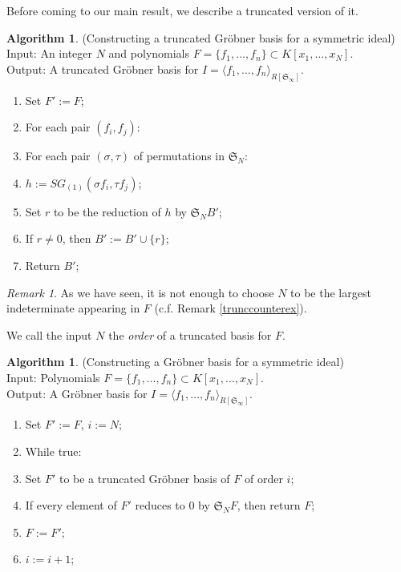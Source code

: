 \documentclass{amsart}
\theoremstyle{definition}
\newtheorem{algorithm}[theorem]{Algorithm}
\theoremstyle{remark}
\newtheorem{remark}[theorem]{Remark}
\numberwithin{equation}{section}
\newcommand{\<}{\langle}
\renewcommand{\>}{\rangle}
\begin{document}
Before coming to our main result, we describe a truncated version of it.

\begin{algorithm}\label{symGBtruncalg}\mbox{}(Constructing a truncated Gr\"obner basis for a symmetric ideal)\\
Input: An integer $N$ and polynomials $F = \{f_1,\ldots,f_n\} \subset  K[x_1,\ldots,x_N]$.\\
Output: A truncated Gr\"obner basis for $I = \<f_1, \ldots, f_n\>_{R[{\mathfrak S}_{\infty}]}$. 
\begin{enumerate}
\item Set $F' := F$;
\item For each pair $(f_i,f_j)$:
\item[]\hspace{0.5cm} For each pair $(\sigma, \tau)$ of permutations in ${\mathfrak S}_{N}$:

\item[]\hspace{1.0cm} $h := SG_{(1)}(\sigma f_i, \tau f_j)$;
\item[]\hspace{1.0cm} Set $r$ to be the reduction of $h$ by ${\mathfrak S}_{N}B'$; 
\item[]\hspace{1.0cm} If $r \neq 0$, then $B' := B' \cup \{r\}$;

\item Return $B'$;
\end{enumerate}
\end{algorithm}

\begin{remark}
As we have seen, it is not enough to choose $N$ to be the largest indeterminate
appearing in $F$ (c.f. Remark \ref{trunccounterex}). 
\end{remark}

We call the input $N$ the \textit{order} of a truncated basis for $F$.

\begin{algorithm}\label{symGBalg}\mbox{}(Constructing a Gr\"obner basis for a symmetric ideal)\\
Input: Polynomials $F = \{f_1,\ldots,f_n\} \subset  K[x_1,\ldots,x_N]$.\\
Output: A Gr\"obner basis for $I = \<f_1, \ldots, f_n\>_{R[{\mathfrak S}_{\infty}]}$. 
\begin{enumerate}
\item Set $F' := F$, $i := N$;
\item While true:
\item[]\hspace{0.5cm} Set $F'$ to be a truncated Gr\"obner basis of $F$ of order $i$;
\item[]\hspace{0.5cm} If every element of $F'$ reduces to $0$ by ${\mathfrak S}_{N}F$, then return $F$;
\item[]\hspace{0.5cm} $F := F'$;
\item[]\hspace{0.5cm} $i := i + 1$;
\end{enumerate}
\end{algorithm}
\end{document}

